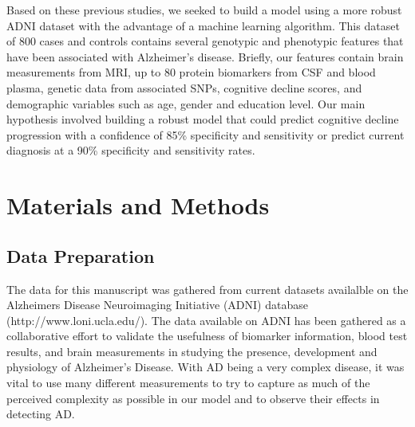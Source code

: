 \documentclass[10pt]{article}
\begin{document}
Based on these previous studies, we seeked to build a model using a more robust ADNI dataset \cite{delor2013} with the advantage of a machine learning algorithm. This dataset of 800 cases and controls contains several genotypic and phenotypic features that have been associated with Alzheimer's disease. Briefly, our features contain brain measurements from MRI, up to 80 protein biomarkers from CSF and blood plasma, genetic data from associated SNPs, cognitive decline scores, and demographic variables such as age, gender and education level. Our main hypothesis involved building a robust model that could predict cognitive decline progression with a confidence of 85\% specificity and sensitivity or predict current diagnosis at a 90\% specificity and sensitivity rates.

\section*{Materials and Methods}

\subsection*{Data Preparation}
The data for this manuscript was gathered from current datasets availalble on the Alzheimers Disease Neuroimaging Initiative (ADNI) database (http://www.loni.ucla.edu/). The data available on ADNI has been gathered as a collaborative effort to validate the usefulness of biomarker information, blood test results, and brain measurements in studying the presence, development and physiology of Alzheimer's Disease. With AD being a very complex disease, it was vital to use many different measurements to try to capture as much of the perceived complexity as possible in our model and to observe their effects in detecting AD. 
\end{document}
